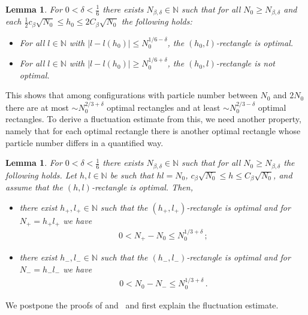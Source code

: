 \documentclass[reqno]{amsart}
\theoremstyle{plain}
\newtheorem{lemma}[theorem]{Lemma}
\theoremstyle{definition}
\numberwithin{equation}{section}
\newcommand{\N}{\mathbb{N}}
\begin{document}
\begin{lemma}\label{lemma: counting}
For   $0<\delta<\frac{1}{6}$ there exists $ N_{\beta,\delta} \in \N$ such that for all $N_0 \ge N_{\beta,\delta}  $ and each $ \frac{1}{2}  c_\beta\sqrt{N_0} \le h_0 \le  2  C_\beta\sqrt{N_0}$  the following holds:
\begin{itemize}
\item[(i)] For all $l \in \N$ with  $|l-l(h_0)| \le N_0^{1/6 - \delta}$, the $(h_0,l)$-rectangle is optimal. 
\item[(ii)] For all $l \in \N$ with  $|l-l(h_0)| \ge N_0^{1/6 + \delta}$, the $(h_0,l)$-rectangle is not optimal.   
\end{itemize}
\end{lemma}


  
This shows that among configurations with  particle  number between $N_0$
and $2N_0$ there are at most $ \sim N_0^{2/3 + \delta}$ optimal 
rectangles   and at least  $ \sim N_0^{2/3 - \delta}$ optimal 
rectangles.  To derive a fluctuation estimate from this, we need another property, namely that for each optimal rectangle there is another optimal rectangle whose  particle  number differs in a quantified way.


\begin{lemma}\label{lemma: counting2}
For   $0<\delta<\frac{1}{6}$ there exists $ N_{\beta,\delta}  \in \N$ such that for all $ N_0  \ge N_{\beta,\delta}  $ the following holds. Let $h,l \in \mathbb{N}$ be such that $hl=N_0$,  $c_\beta\sqrt{N_0} \le h \le C_\beta\sqrt{N_0}$,      and assume that the $(h,l)$-rectangle is optimal. Then,   
\begin{itemize}
\item[(i)]  there exist $h_+,l_+\in \mathbb{N}$ such that the $(h_+,l_+)$-rectangle is optimal and for $N_+ = h_+ l_+$ we have
\begin{align*}
0< N_+-N_0\le  N_0^{1/3+\delta}\,;
\end{align*}
\item[(ii)]   there exist $h_-,l_-\in \mathbb{N}$ such that the $(h_-,l_-)$-rectangle is optimal and for $N_- = h_- l_-$ we have 
\begin{align*}
0< N_0-N_-\le  N_0^{1/3+\delta}\,.
\end{align*}
\end{itemize}
\end{lemma}
 
We postpone the proofs of  and~ and first explain the fluctuation estimate. 
\end{document}
